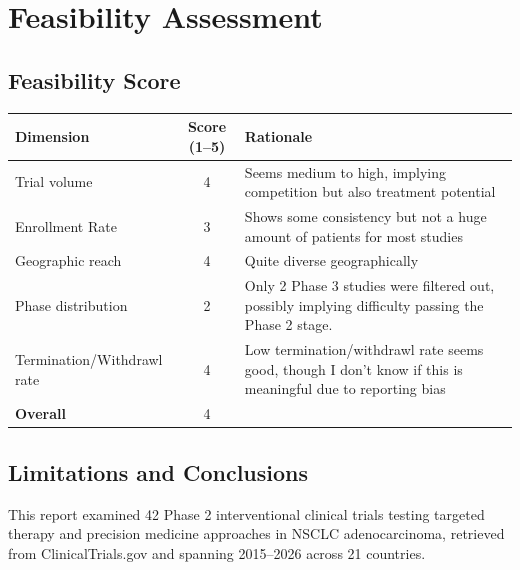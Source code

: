 \documentclass[11pt, letterpaper]{article}
\begin{document}
\section{Feasibility Assessment}

\subsection{Feasibility Score}
\begin{center}
\begin{tabular}{l c p{7cm}}
  \toprule
  \textbf{Dimension} & \textbf{Score (1--5)} & \textbf{Rationale} \\
  \midrule
  Trial volume                        & \hspace{6pt}4   & Seems medium to high, implying competition but also treatment potential \\
  Enrollment Rate            & \hspace{6pt}3  & Shows some consistency but not a huge amount of patients for most studies \\
  Geographic reach                    & \hspace{6pt}4   & Quite diverse geographically \\
  Phase distribution                  & \hspace{6pt}2  & Only 2 Phase 3 studies were filtered out, possibly implying difficulty passing the Phase 2 stage.\\
  Termination/Withdrawl rate      & \hspace{6pt}4 & Low termination/withdrawl rate seems good, though I don't know if this is meaningful due to reporting bias\\
  \midrule
  \textbf{Overall}       & \hspace{6pt}4  & \\
  \bottomrule
\end{tabular}
\end{center}

\subsection{Limitations and Conclusions}

This report examined 42 Phase 2 interventional clinical trials testing targeted therapy
and precision medicine approaches in NSCLC adenocarcinoma, retrieved from ClinicalTrials.gov
and spanning 2015--2026 across 21 countries.
\end{document}
